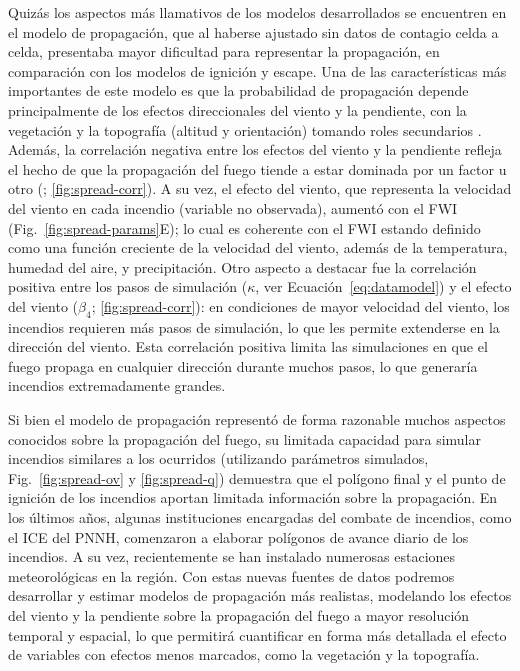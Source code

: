 Quizás los aspectos más llamativos de los modelos desarrollados se encuentren en el modelo de propagación, que al haberse ajustado sin datos de contagio celda a celda, presentaba mayor dificultad para representar la propagación, en comparación con los modelos de ignición y escape. Una de las características más importantes de este modelo es que la probabilidad de propagación depende principalmente de los efectos direccionales del viento y la pendiente, con la vegetación y la topografía (altitud y orientación) tomando roles secundarios \citep{rothermel_mathematical_1972}. Además, la correlación negativa entre los efectos del viento y la pendiente refleja el hecho de que la propagación del fuego tiende a estar dominada por un factor u otro (\citealt{laneri_first_2020}; \cref{fig:spread-corr}). A su vez, el efecto del viento, que representa la velocidad del viento en cada incendio (variable no observada), aumentó con el FWI (Fig.~\ref{fig:spread-params}E); lo cual es coherente con el FWI estando definido como una función creciente de la velocidad del viento, además de la temperatura, humedad del aire, y precipitación. Otro aspecto a destacar fue la correlación positiva entre los pasos de simulación ($\kappa$, ver Ecuación~\ref{eq:datamodel}) y el efecto del viento ($\beta_4$; \cref{fig:spread-corr}): en condiciones de mayor velocidad del viento, los incendios requieren más pasos de simulación, lo que les permite extenderse en la dirección del viento. Esta correlación positiva limita las simulaciones en que el fuego propaga en cualquier dirección durante muchos pasos, lo que generaría incendios extremadamente grandes. 

Si bien el modelo de propagación representó de forma razonable muchos aspectos conocidos sobre la propagación del fuego, su limitada capacidad para simular incendios similares a los ocurridos (utilizando parámetros simulados, Fig.~\ref{fig:spread-ov} y \ref{fig:spread-q}) demuestra que el polígono final y el punto de ignición de los incendios aportan limitada información sobre la propagación. En los últimos años, algunas instituciones encargadas del combate de incendios, como el ICE del PNNH, comenzaron a elaborar polígonos de avance diario de los incendios. A su vez, recientemente se han instalado numerosas estaciones meteorológicas en la región. Con estas nuevas fuentes de datos podremos desarrollar y estimar modelos de propagación más realistas, modelando los efectos del viento y la pendiente sobre la propagación del fuego a mayor resolución temporal y espacial, lo que permitirá cuantificar en forma más detallada el efecto de variables con efectos menos marcados, como la vegetación y la topografía. 

